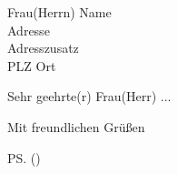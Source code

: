 \documentclass[
	ngerman,
	fontsize=11pt,
	paper=a4,
	enlargefirstpage=on,
	pagenumber=headright,
	headsepline=on,
	parskip=half,
	fromphone=on,
	fromemail=true,
	fromalign=right, %
	foldmarks=true,
	draft=false
]{scrlttr2}
\begin{document}
\makeatletter


\begin{letter}{Frau(Herrn) Name\\Adresse\\Adresszusatz\\PLZ Ort}

\opening{Sehr geehrte(r) Frau(Herr) ...}

\Blindtext

\closing{Mit freundlichen Grüßen}
\ps(\blindtext)

\end{letter}
\end{document}

